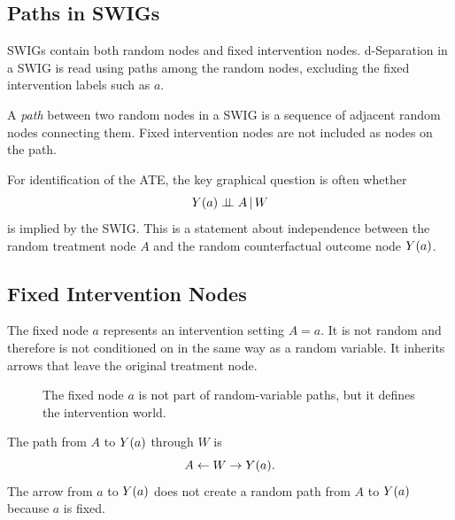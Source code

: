 \label{lec:3-4}

\subsection{Paths in SWIGs}

SWIGs contain both random nodes and fixed intervention nodes. d-Separation in a SWIG is read using paths among the random nodes, excluding the fixed intervention labels such as $a$.

\begin{definition}
A \emph{path} between two random nodes in a SWIG is a sequence of adjacent random nodes connecting them. Fixed intervention nodes are not included as nodes on the path.
\end{definition}

For identification of the ATE, the key graphical question is often whether
\[
Y(a)\perp\!\!\!\perp A\,\vert\, W
\]
is implied by the SWIG. This is a statement about independence between the random treatment node $A$ and the random counterfactual outcome node $Y(a)$.

\subsection{Fixed Intervention Nodes}

The fixed node $a$ represents an intervention setting $A=a$. It is not random and therefore is not conditioned on in the same way as a random variable. It inherits arrows that leave the original treatment node.

\begin{figure}[H]
\centering
{}
\caption{The fixed node $a$ is not part of random-variable paths, but it defines the intervention world.}
\end{figure}

The path from $A$ to $Y(a)$ through $W$ is
\[
A\leftarrow W\to Y(a).
\]
The arrow from $a$ to $Y(a)$ does not create a random path from $A$ to $Y(a)$ because $a$ is fixed.

